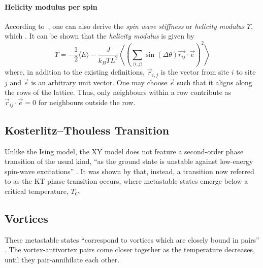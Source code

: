 		\paragraph{Helicity modulus per spin}
			According to~\cite{teitel_helicity}, one can also derive the \emph{spin wave stiffness} or \emph{helicity modulus} $\Upsilon$, which  \cite[p. 598]{teitel_helicity}. It can be shown that the \emph{helicity modulus} is given by
			\begin{equation}\label{eq:helicity_modulus}
				\Upsilon = -\frac{1}{2} \langle E \rangle - \frac{J}{k_B T L^2} \left\langle \left(\sum_{\langle i,j \rangle}{\sin(\Delta \theta) \vec{r_{ij}} \cdot \vec{e}}\right)^2 \right\rangle
			\end{equation}
			\cite[eq. 3.2]{teitel_helicity} where, in addition to the existing definitions, $\vec{r}_{i,j}$ is the vector from site $i$ to site $j$ and $\vec{e}$ is an arbitrary unit vector. One may choose $\vec{e}$ such that it aligns along the rows of the lattice. Thus, only neighbours within a row contribute as $\vec{r}_{ij} \cdot \vec{e} = 0$ for neighbours outside the row.
	
	\subsection{Kosterlitz–Thouless Transition}
		Unlike the Ising model, the XY model does not feature a second-order phase transition of the usual kind, \enquote{as the ground state is unstable against low-energy spin-wave excitations} \cite[p. 1190]{kosterlitz}. It was shown by \cite{kosterlitz} that, instead, a transition now referred to as the KT phase transition occurs, where metastable states emerge below a critical temperature, $T_C$.
	
	\subsection{Vortices}
		These metastable states \enquote{correspond to vortices which are closely bound in pairs} \cite[p. 1190]{kosterlitz}. The vortex-antivortex pairs come closer together as the temperature decreases, until they pair-annihilate each other.